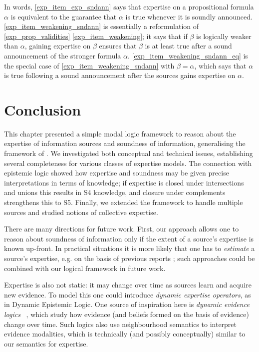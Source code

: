 In words, \cref{exp_item_exp_sndann} says that expertise on a propositional
formula $\alpha$ is equivalent to the guarantee that $\alpha$ is true whenever
it is soundly announced. \cref{exp_item_weakening_sndann} is essentially a
reformulation of \cref{exp_prop_validities} \cref{exp_item_weakening}; it says that
if $\beta$ is logically weaker than $\alpha$, gaining expertise on $\beta$
ensures that $\beta$ is at least true after a sound announcement of the
stronger formula $\alpha$.  \cref{exp_item_weakening_sndann_eq} is the special
case of \cref{exp_item_weakening_sndann} with $\beta = \alpha$, which says that
$\alpha$ is true following a sound announcement after the sources gains
expertise on $\alpha$.

\section{Conclusion}
\label{exp_sec_conclusion}

This chapter presented a simple modal logic framework to reason about the
expertise of information sources and soundness of information, generalising the
framework of \textcite{singleton2021logic}. We investigated both conceptual and
technical issues, establishing several completeness for various classes of
expertise models. The connection with epistemic logic showed how expertise and
soundness may be given precise interpretations in terms of knowledge; if
expertise is closed under intersections and unions this results in S4
knowledge, and closure under complements strengthens this to S5. Finally, we
extended the framework to handle multiple sources and studied notions of
collective expertise.

There are many directions for future work.
%
First, our approach allows one to reason about soundness of information
only if the extent of a source's expertise is known up-front. In practical
situations it is more likely that one has to \emph{estimate} a source's
expertise, e.g. on the basis of previous reports
\cite{hunter_building_2021,dastani2004inferring}; such approaches could be
combined with our logical framework in future work.

Expertise is also not static: it may change over time as sources learn and
acquire new evidence. To model this one could introduce \emph{dynamic expertise
operators}, as in Dynamic Epistemic Logic. One
source of inspiration here is \emph{dynamic evidence logics}
~\cite{van2011dynamic,vanbenthem2014106}, which study how evidence (and
beliefs formed on the basis of evidence) change over time. Such logics also use
neighbourhood semantics to interpret evidence modalities, which is technically
(and possibly conceptually) similar to our semantics for expertise.

